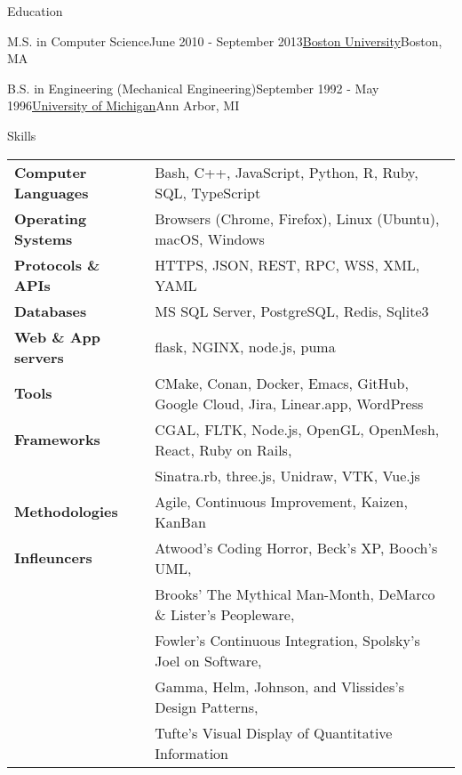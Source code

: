 \documentclass{resume}
\begin{document}
\begin{rSection}{Education}

  \begin{rSubsection}{M.S. in Computer Science}{June 2010 - September 2013}{\href{https://www.bu.edu/}{Boston University}}{Boston, MA}
  \item[]
  \end{rSubsection}

  \begin{rSubsection}{B.S. in Engineering (Mechanical Engineering)}{September 1992 - May 1996}{\href{https://www.umich.edu/}{University of Michigan}}{Ann Arbor, MI}
  \item[]
  \end{rSubsection}

\end{rSection}


\begin{rSection}{Skills}
\begin{tabular}{ @{} >{\bfseries}l @{\hspace{6ex}} l }
Computer Languages & Bash, C++, JavaScript, Python, R, Ruby, SQL, TypeScript \\
Operating Systems & Browsers (Chrome, Firefox), Linux (Ubuntu), macOS, Windows \\
Protocols \& APIs & HTTPS, JSON, REST, RPC, WSS, XML, YAML \\
Databases & MS SQL Server, PostgreSQL, Redis, Sqlite3 \\
Web \& App servers & flask, NGINX, node.js, puma \\
Tools & CMake, Conan, Docker, Emacs, GitHub, Google Cloud, Jira, Linear.app, WordPress \\
Frameworks & CGAL, FLTK, Node.js, OpenGL, OpenMesh, React, Ruby on Rails, \\
 & Sinatra.rb, three.js, Unidraw, VTK, Vue.js \\
Methodologies & Agile, Continuous Improvement, Kaizen, KanBan \\
Infleuncers & Atwood's Coding Horror, Beck's XP, Booch's UML, \\
 & Brooks' The Mythical Man-Month, DeMarco \& Lister's Peopleware, \\
 & Fowler's Continuous Integration, Spolsky's Joel on Software, \\
 & Gamma, Helm, Johnson, and Vlissides's Design Patterns, \\
 & Tufte's Visual Display of Quantitative Information
\end{tabular}
\end{rSection}
\end{document}
